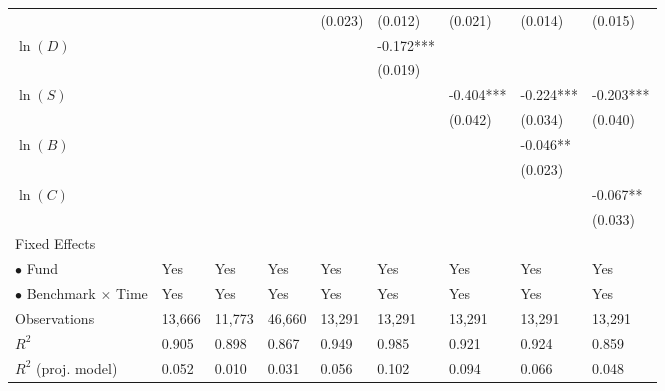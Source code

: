 \documentclass[openany]{book}
\theoremstyle{definition}
\theoremstyle{definition}
\theoremstyle{definition}
\theoremstyle{remark}
\begin{document}
\begin{table}[ht]
\begin{tabularx}{0.975\textwidth}{lYYYYYYYY}
   &  &  &  & (0.023) & (0.012) & (0.021) & (0.014) & (0.015) \\ 
  $\ln(D)$ &  &  &  &  & -0.172*** &  &  &  \\ 
   &  &  &  &  & (0.019) &  &  &  \\ 
  $\ln(S)$ &  &  &  &  &  & -0.404*** & -0.224*** & -0.203*** \\ 
   &  &  &  &  &  & (0.042) & (0.034) & (0.040) \\ 
  $\ln(B)$ &  &  &  &  &  &  & -0.046** &  \\ 
   &  &  &  &  &  &  & (0.023) &  \\ 
  $\ln(C)$ &  &  &  &  &  &  &  & -0.067** \\ 
   &  &  &  &  &  &  &  & (0.033) \\ 
  Fixed Effects &  &  &  &  &  &  &  &  \\ 
  $\bullet$ Fund & Yes & Yes & Yes & Yes & Yes & Yes & Yes & Yes \\ 
  $\bullet$ Benchmark $\times$ Time & Yes & Yes & Yes & Yes & Yes & Yes & Yes & Yes \\ 
  Observations & 13,666 & 11,773 & 46,660 & 13,291 & 13,291 & 13,291 & 13,291 & 13,291 \\ 
  $R^2$ & 0.905 & 0.898 & 0.867 & 0.949 & 0.985 & 0.921 & 0.924 & 0.859 \\ 
  $R^2$ (proj. model) & 0.052 & 0.010 & 0.031 & 0.056 & 0.102 & 0.094 & 0.066 & 0.048 \\ 
   \bottomrule
\end{tabularx}
\endgroup
\end{table}
\end{document}
